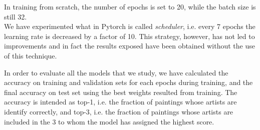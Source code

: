 \documentclass{article}
\begin{document}
In training from scratch, the number of epochs is set to 20, while the batch size is still 32.\\ 
We have experimented what in Pytorch is called \textit{scheduler}, i.e. every 7 epochs the learning rate is decreased by a factor of 10. This strategy, however, has not led to improvements and in fact the results exposed have been obtained without the use of this technique.

In order to evaluate all the models that we study, we have calculated the accuracy on training and validation sets for each epochs during training, and the final accuracy on test set using the best weights resulted from training. The accuracy is intended as top-1, i.e.  the fraction of paintings whose artists are identify correctly, and top-3, i.e. the fraction of paintings whose artists are included in the 3 to whom the model has assigned the highest score.
\end{document}
